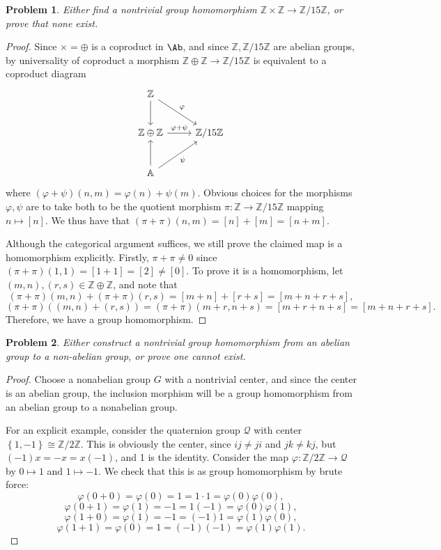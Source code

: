 \documentclass[11pt, letterpaper]{article}
\theoremstyle{plain}
\newtheorem{problem}{Problem}[section]
\begin{document}
\begin{problem}
	Either find a nontrivial group homomorphism $\mathbb{Z} \times \mathbb{Z} \to \mathbb{Z} /15\mathbb{Z} $, or prove that none exist.
\end{problem}
\begin{proof}
	Since $\times =\oplus $ is a coproduct in $\Ab $, and since $\mathbb{Z} ,\mathbb{Z} /15\mathbb{Z} $ are abelian groups, by universality of coproduct a morphism $\mathbb{Z} \oplus \mathbb{Z} \to \mathbb{Z} /15\mathbb{Z} $ is equivalent to a coproduct diagram
	\[\begin{tikzcd}[row sep = 2.5em, column sep = 2.5em]
	\mathbb{Z} \ar[" \varphi  ", dr] \ar[d]  &  \\
	\mathbb{Z} \oplus \mathbb{Z} \ar[" \varphi +\psi   ", r]  & \mathbb{Z} /15\mathbb{Z}  \\
	\mathbb{A} \ar[" \psi  "', ur] \ar[u]  & 
	\end{tikzcd}\]
	where $(\varphi +\psi )(n,m)=\varphi (n)+\psi (m)$. Obvious choices for the morphisms $\varphi ,\psi $ are to take both to be the quotient morphism $\pi :\mathbb{Z} \to \mathbb{Z} /15\mathbb{Z} $ mapping $n\mapsto [n]$. We thus have that $(\pi+\pi )(n,m)=[n]+[m]=[n+m]$.

	Although the categorical argument suffices, we still prove the claimed map is a homomorphism explicitly. Firstly, $\pi +\pi \neq 0$ since $(\pi +\pi )(1,1)=[1+1]=[2]\neq [0]$. To prove it is a homomorphism, let $(m,n),(r,s)\in\mathbb{Z}\oplus \mathbb{Z} $, and note that
	\[
		(\pi +\pi )(m,n)+(\pi +\pi )(r,s)=[m+n]+[r+s]=[m+n+r+s],
	\]
	\[
		(\pi +\pi )((m,n)+(r,s))=(\pi +\pi )(m+r,n+s)=[m+r+n+s]=[m+n+r+s]
	.\]
	Therefore, we have a group homomorphism.
\end{proof}

\begin{problem}
	Either construct a nontrivial group homomorphism from an abelian group to a non-abelian group, or prove one cannot exist.
\end{problem}
\begin{proof}
	Choose a nonabelian group $G$ with a nontrivial center, and since the center is an abelian group, the inclusion morphism will be a group homomorphism from an abelian group to a nonabelian group.

	For an explicit example, consider the quaternion group $\mathcal{Q} $ with center $\left\{ 1,-1 \right\} \cong \mathbb{Z} /2\mathbb{Z} $. This is obviously the center, since $ij\neq ji$ and $jk\neq kj$, but $(-1)x=-x=x(-1)$, and 1 is the identity. Consider the map $\varphi :\mathbb{Z} /2\mathbb{Z} \to \mathcal{Q} $ by $0\mapsto 1$ and $1\mapsto -1$. We check that this is as group homomorphism by brute force:
	\[
		\varphi (0+0)=\varphi (0)=1=1\cdot 1=\varphi (0)\varphi (0)
	,\]
	\[
		\varphi (0+1)=\varphi (1)=-1=1(-1)=\varphi (0)\varphi (1),
	\]
	\[
		\varphi (1+0)=\varphi (1)=-1=(-1)1=\varphi (1)\varphi (0),
	\]
	\[
		\varphi (1+1)=\varphi (0)=1=(-1)(-1)=\varphi (1)\varphi (1)
	.\]
\end{proof}
\end{document}
